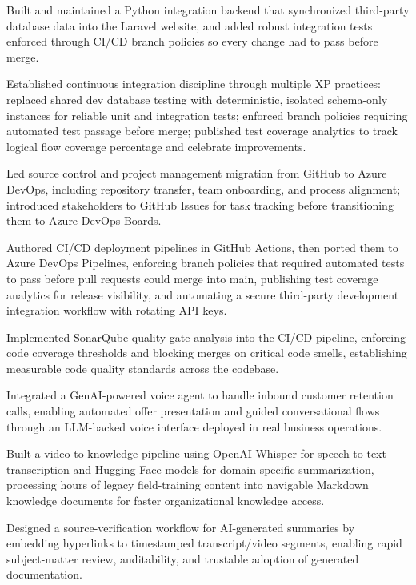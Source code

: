 \documentclass{../styles/cv}
\begin{document}
    \item Built and maintained a Python integration backend that synchronized third-party database data into the Laravel website, and added robust integration tests enforced through CI/CD branch policies so every change had to pass before merge.
    \item Established continuous integration discipline through multiple XP practices: replaced shared dev database testing with deterministic, isolated schema-only instances for reliable unit and integration tests; enforced branch policies requiring automated test passage before merge; published test coverage analytics to track logical flow coverage percentage and celebrate improvements.
    \item Led source control and project management migration from GitHub to Azure DevOps, including repository transfer, team onboarding, and process alignment; introduced stakeholders to GitHub Issues for task tracking before transitioning them to Azure DevOps Boards.
    \item Authored CI/CD deployment pipelines in GitHub Actions, then ported them to Azure DevOps Pipelines, enforcing branch policies that required automated tests to pass before pull requests could merge into main, publishing test coverage analytics for release visibility, and automating a secure third-party development integration workflow with rotating API keys.
    \item Implemented SonarQube quality gate analysis into the CI/CD pipeline, enforcing code coverage thresholds and blocking merges on critical code smells, establishing measurable code quality standards across the codebase.
    \item Integrated a GenAI-powered voice agent to handle inbound customer retention calls, enabling automated offer presentation and guided conversational flows through an LLM-backed voice interface deployed in real business operations.
    \item Built a video-to-knowledge pipeline using OpenAI Whisper for speech-to-text transcription and Hugging Face models for domain-specific summarization, processing hours of legacy field-training content into navigable Markdown knowledge documents for faster organizational knowledge access.
    \item Designed a source-verification workflow for AI-generated summaries by embedding hyperlinks to timestamped transcript/video segments, enabling rapid subject-matter review, auditability, and trustable adoption of generated documentation.
    \resumenestedlistend
\resumesublistend
\end{document}
